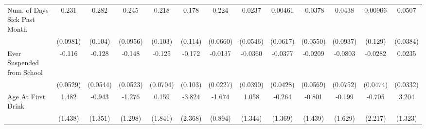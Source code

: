 {\begin{tabular}{l*{12}{c}}
\addlinespace
Num. of Days Sick Past Month&       0.231\sym{*}  &       0.282\sym{**} &       0.245\sym{*}  &       0.218\sym{*}  &       0.178         &       0.224\sym{***}&      0.0237         &     0.00461         &     -0.0378         &      0.0438         &     0.00906         &      0.0507         \\
            &    (0.0981)         &     (0.104)         &    (0.0956)         &     (0.103)         &     (0.114)         &    (0.0660)         &    (0.0546)         &    (0.0617)         &    (0.0550)         &    (0.0937)         &     (0.129)         &    (0.0384)         \\
\addlinespace
Ever Suspended from School&      -0.116\sym{*}  &      -0.128\sym{*}  &      -0.148\sym{**} &      -0.125         &      -0.172         &     -0.0137         &     -0.0360         &     -0.0377         &     -0.0209         &     -0.0803         &     -0.0282         &      0.0235         \\
            &    (0.0529)         &    (0.0544)         &    (0.0523)         &    (0.0704)         &     (0.103)         &    (0.0227)         &    (0.0390)         &    (0.0428)         &    (0.0569)         &    (0.0752)         &    (0.0474)         &    (0.0332)         \\
\addlinespace
Age At First Drink&       1.482         &      -0.943         &      -1.276         &       0.159         &      -3.824         &      -1.674         &       1.058         &      -0.264         &      -0.801         &      -0.199         &      -0.705         &       3.204\sym{*}  \\
            &     (1.438)         &     (1.351)         &     (1.298)         &     (1.841)         &     (2.368)         &     (0.894)         &     (1.344)         &     (1.369)         &     (1.439)         &     (1.629)         &     (2.217)         &     (1.323)         \\
\bottomrule
\end{tabular}
}
